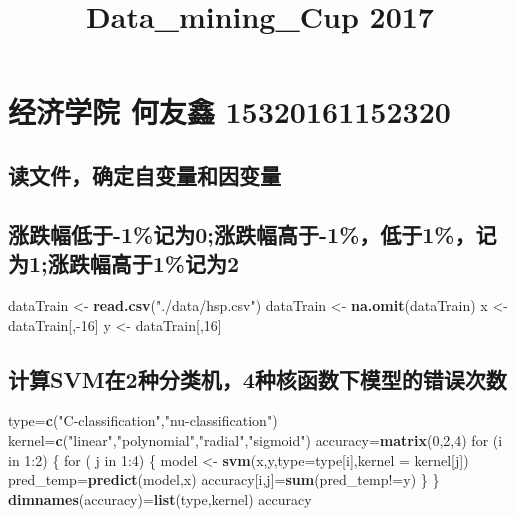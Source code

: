\documentclass[]{article}
\title{Data\_mining\_Cup 2017}
\author{}
\date{}
\newenvironment{Shaded}{\begin{snugshade}}{\end{snugshade}}
\newcommand{\KeywordTok}[1]{\textcolor[rgb]{0.13,0.29,0.53}{\textbf{{#1}}}}
\newcommand{\DataTypeTok}[1]{\textcolor[rgb]{0.13,0.29,0.53}{{#1}}}
\newcommand{\DecValTok}[1]{\textcolor[rgb]{0.00,0.00,0.81}{{#1}}}
\newcommand{\StringTok}[1]{\textcolor[rgb]{0.31,0.60,0.02}{{#1}}}
\newcommand{\NormalTok}[1]{{#1}}
\begin{document}
\maketitle

\section{经济学院 何友鑫 15320161152320}\label{--15320161152320}

\subsection{读文件，确定自变量和因变量}

\subsection{涨跌幅低于-1\%记为0;涨跌幅高于-1\%，低于1\%，记为1;涨跌幅高于1\%记为2}\label{-10-11112}

\begin{Shaded}
\begin{Highlighting}[]
\NormalTok{dataTrain <-}\StringTok{ }\KeywordTok{read.csv}\NormalTok{(}\StringTok{"./data/hsp.csv"}\NormalTok{)}
\NormalTok{dataTrain <-}\StringTok{ }\KeywordTok{na.omit}\NormalTok{(dataTrain)}
\NormalTok{x <-}\StringTok{ }\NormalTok{dataTrain[,-}\DecValTok{16}\NormalTok{]}
\NormalTok{y <-}\StringTok{ }\NormalTok{dataTrain[,}\DecValTok{16}\NormalTok{]}
\end{Highlighting}
\end{Shaded}

\subsection{计算SVM在2种分类机，4种核函数下模型的错误次数}\label{svm24}

\begin{Shaded}
\begin{Highlighting}[]
\NormalTok{type=}\KeywordTok{c}\NormalTok{(}\StringTok{"C-classification"}\NormalTok{,}\StringTok{"nu-classification"}\NormalTok{)}
\NormalTok{kernel=}\KeywordTok{c}\NormalTok{(}\StringTok{"linear"}\NormalTok{,}\StringTok{"polynomial"}\NormalTok{,}\StringTok{"radial"}\NormalTok{,}\StringTok{"sigmoid"}\NormalTok{)}
\NormalTok{accuracy=}\KeywordTok{matrix}\NormalTok{(}\DecValTok{0}\NormalTok{,}\DecValTok{2}\NormalTok{,}\DecValTok{4}\NormalTok{)}
\NormalTok{for (i in }\DecValTok{1}\NormalTok{:}\DecValTok{2}\NormalTok{)}
\NormalTok{\{}
  \NormalTok{for ( j in }\DecValTok{1}\NormalTok{:}\DecValTok{4}\NormalTok{) }
  \NormalTok{\{}
    \NormalTok{model <-}\StringTok{ }\KeywordTok{svm}\NormalTok{(x,y,}\DataTypeTok{type=}\NormalTok{type[i],}\DataTypeTok{kernel =} \NormalTok{kernel[j])}
    \NormalTok{pred_temp=}\KeywordTok{predict}\NormalTok{(model,x)}
    \NormalTok{accuracy[i,j]=}\KeywordTok{sum}\NormalTok{(pred_temp!=y)}
  \NormalTok{\}}
\NormalTok{\}}
\KeywordTok{dimnames}\NormalTok{(accuracy)=}\KeywordTok{list}\NormalTok{(type,kernel)}
\NormalTok{accuracy}
\end{Highlighting}
\end{Shaded}
\end{document}
